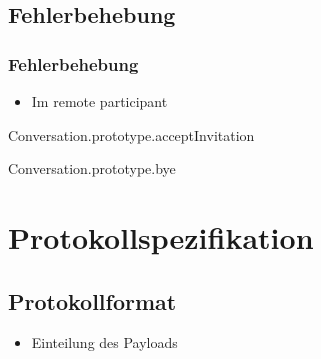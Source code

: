 \documentclass{beamer}
\begin{document}
\subsection{Fehlerbehebung}
\begin{frame}
	\frametitle{Fehlerbehebung}
	\begin{itemize}[<+->]
		\item Im remote participant
	\end{itemize}

	\begin{exampleblock}{Conversation.prototype.acceptInvitation}
	
	\end{exampleblock}

	\begin{exampleblock}{Conversation.prototype.bye}
	
	\end{exampleblock}

	
	
	

\end{frame}








\section{Protokollspezifikation}
\subsection{Protokollformat}
\begin{frame}
\begin{itemize}
\item Einteilung des Payloads
\end{itemize}
\end{frame}
\end{document}
